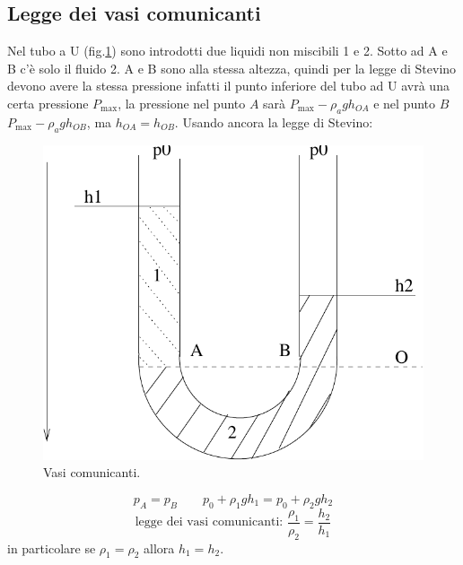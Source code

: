 \subsection{Legge dei vasi comunicanti}
Nel tubo a U (fig.\@\ref{vasicom}) sono introdotti due liquidi non miscibili 1 e 2. Sotto ad A e B c'è solo il fluido 2. A e B sono alla stessa altezza, quindi per la legge di Stevino devono avere la stessa pressione infatti il punto inferiore del tubo ad U avrà una certa pressione $P_{\max}$, la pressione nel punto $A$ sarà $P_{\max} - \rho_a g h_{OA}$ e nel punto $B$ $P_{\max} - \rho_a g h_{OB}$, ma $h_{OA}=h_{OB}$. Usando ancora la legge di Stevino:
\begin{figure}[htbp]
\centering
\includegraphics[scale=0.5]{immagini/fisica1/vasi_comunicanti}
\caption{Vasi comunicanti.}
\label{vasicom}
\end{figure}
\[p_A=p_B\qquad p_0+\rho_1 gh_1=p_0+\rho_2gh_2\]
\[\text{legge dei vasi comunicanti: }\frac{\rho_1}{\rho_2}=\frac{h_2}{h_1}\]
in particolare se $\rho_1=\rho_2$ allora $h_1=h_2$.
